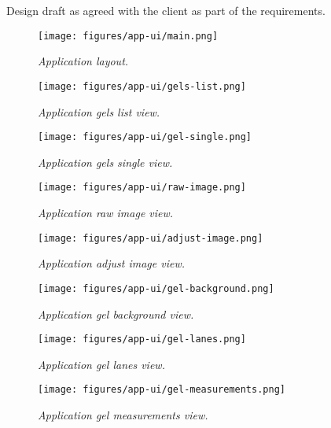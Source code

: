 Design draft as agreed with the client as part of the requirements.

\begin{figure}[ht]
    \centering
    \texttt{[image: figures/app-ui/main.png]}
    \caption{\textit{Application layout.}}
    \label{fig:main}
\end{figure}

\begin{figure}[ht]
    \centering
    \texttt{[image: figures/app-ui/gels-list.png]}
    \caption{\textit{Application gels list view.}}
    \label{fig:gels-list}
\end{figure}

\begin{figure}[ht]
    \centering
    \texttt{[image: figures/app-ui/gel-single.png]}
    \caption{\textit{Application gels single view.}}
    \label{fig:gels-single}
\end{figure}

\begin{figure}[ht]
    \centering
    \texttt{[image: figures/app-ui/raw-image.png]}
    \caption{\textit{Application raw image view.}}
    \label{fig:raw-image}
\end{figure}

\begin{figure}[ht]
    \centering
    \texttt{[image: figures/app-ui/adjust-image.png]}
    \caption{\textit{Application adjust image view.}}
    \label{fig:adjust-image}
\end{figure}

\begin{figure}[ht]
    \centering
    \texttt{[image: figures/app-ui/gel-background.png]}
    \caption{\textit{Application gel background view.}}
    \label{fig:gel-background}
\end{figure}

\begin{figure}[ht]
    \centering
    \texttt{[image: figures/app-ui/gel-lanes.png]}
    \caption{\textit{Application gel lanes view.}}
    \label{fig:gel-lanes}
\end{figure}

\begin{figure}[ht]
    \centering
    \texttt{[image: figures/app-ui/gel-measurements.png]}
    \caption{\textit{Application gel measurements view.}}
    \label{fig:gel-measurements}
\end{figure}
